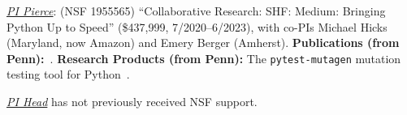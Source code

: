 


\emph{\underline{PI Pierce}}: (NSF 1955565) ``Collaborative Research:
SHF: Medium: Bringing Python Up to Speed'' (\$437,999, 7/2020--6/2023), with co-PIs Michael Hicks (Maryland, now Amazon) and Emery
Berger (Amherst).
{\bf Publications (from Penn):}~\cite{DBLP:conf/esop/GoldsteinHLP21,goldstein2022parsing}.
{\bf Research Products (from Penn):} The {\tt pytest-mutagen} mutation
testing tool for Python~\cite{pytestmutagen}.

\emph{\underline{PI Head}} has not previously received NSF support.

%

